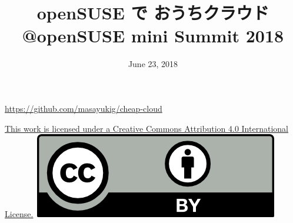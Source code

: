 \documentclass[aspectratio=169,11pt,hyperref={colorlinks=true}]{beamer}
\author[Masayuki Igawa]{%
    \texorpdfstring{%
        \begin{columns}
        \column{.45\linewidth}
            \centering
            Masayuki Igawa\\
            \href{mailto:masayuki@igawa.io}{masayuki@igawa.io}\\
            \texttt{masayukig on
              \href{https://freenode.net/}{Freenode},
              \href{https://github.com/masayukig}{GitHub},
              \href{https://twitter.com/masayukig}{Twitter},
              \href{https://www.linkedin.com/in/masayukig/}{LinkedIn}}
        \end{columns}
        }
    {Masayuki Igawa}
}
\date{June 23, 2018}
\title[private-cloud-on-openSUSE
  \hspace{2em}\insertframenumber/\inserttotalframenumber]{openSUSE で おうちクラウド
  \\ @openSUSE mini Summit 2018}
\begin{document}
{%
\begin{frame}[noframenumbering]
  \hypersetup{colorlinks,urlcolor=susedark}
  \titlepage{}
  \centering
  \@place \par
  \href{https://github.com/masayukig/cheap-cloud}{https://github.com/masayukig/cheap-cloud}
  \vspace{1em}
  \begin{flushright}
    \tiny\href{https://creativecommons.org/licenses/by/4.0/}{This work
      is licensed under a Creative Commons Attribution 4.0
      International License.}~\includegraphics[scale=0.3]{cc_by.png}
  \end{flushright}
\end{frame}
}
\end{document}
